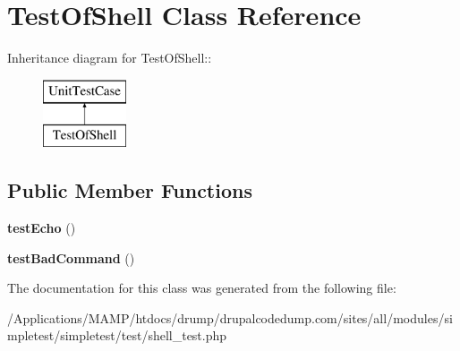 \hypertarget{class_test_of_shell}{
\section{TestOfShell Class Reference}
\label{class_test_of_shell}
}
Inheritance diagram for TestOfShell::\begin{figure}[H]
\begin{center}
\leavevmode
\includegraphics[height=2cm]{class_test_of_shell}
\end{center}
\end{figure}
\subsection*{Public Member Functions}
\begin{DoxyCompactItemize}
\item 
\hypertarget{class_test_of_shell_ae2814c57c109ea466af536ce0640f83e}{
{\bfseries testEcho} ()}
\label{class_test_of_shell_ae2814c57c109ea466af536ce0640f83e}

\item 
\hypertarget{class_test_of_shell_a806a04cde49ca1c83440f48fc41cfdab}{
{\bfseries testBadCommand} ()}
\label{class_test_of_shell_a806a04cde49ca1c83440f48fc41cfdab}

\end{DoxyCompactItemize}


The documentation for this class was generated from the following file:\begin{DoxyCompactItemize}
\item 
/Applications/MAMP/htdocs/drump/drupalcodedump.com/sites/all/modules/simpletest/simpletest/test/shell\_\-test.php\end{DoxyCompactItemize}
